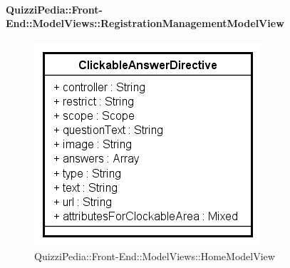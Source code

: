 	\paragraph{QuizziPedia::Front-End::ModelViews::RegistrationManagementModelView}
	
	\label{QuizziPedia::Front-End::ModelViews::RegistrationManagementModelView}
	
	\begin{figure}[ht]
		\centering
		\includegraphics[scale=0.5,keepaspectratio]{UML/Classi/Front-End/QuizziPedia_Front-end_Templates_ClickableAnswerTemplate.png}
		\caption{QuizziPedia::Front-End::ModelViews::HomeModelView}
	\end{figure} \FloatBarrier
	
